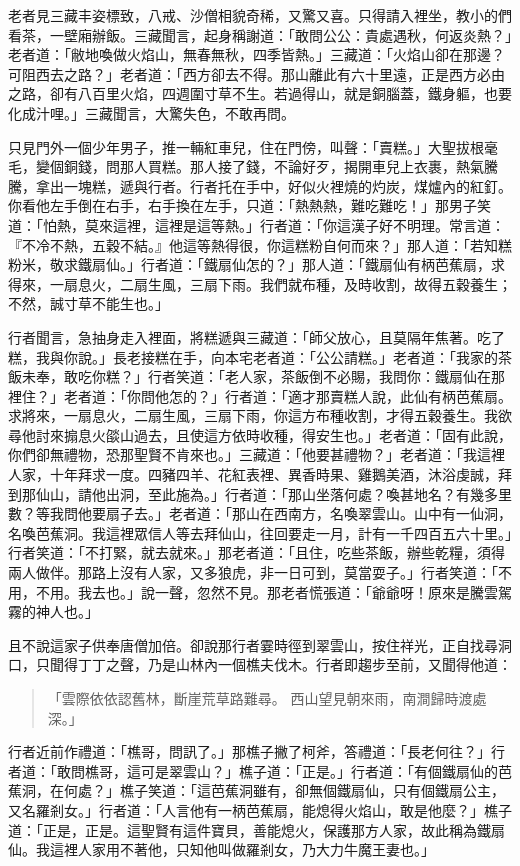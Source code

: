 老者見三藏丰姿標致，八戒、沙僧相貌奇稀，又驚又喜。只得請入裡坐，教小的們看茶，一壁廂辦飯。三藏聞言，起身稱謝道：「敢問公公：貴處遇秋，何返炎熱？」老者道：「敝地喚做火焰山，無春無秋，四季皆熱。」三藏道：「火焰山卻在那邊？可阻西去之路？」老者道：「西方卻去不得。那山離此有六十里遠，正是西方必由之路，卻有八百里火焰，四週圍寸草不生。若過得山，就是銅腦蓋，鐵身軀，也要化成汁哩。」三藏聞言，大驚失色，不敢再問。

只見門外一個少年男子，推一輛紅車兒，住在門傍，叫聲：「賣糕。」大聖拔根毫毛，變個銅錢，問那人買糕。那人接了錢，不論好歹，揭開車兒上衣裹，熱氣騰騰，拿出一塊糕，遞與行者。行者托在手中，好似火裡燒的灼炭，煤爐內的紅釘。你看他左手倒在右手，右手換在左手，只道：「熱熱熱，難吃難吃！」那男子笑道：「怕熱，莫來這裡，這裡是這等熱。」行者道：「你這漢子好不明理。常言道：『不冷不熱，五穀不結。』他這等熱得很，你這糕粉自何而來？」那人道：「若知糕粉米，敬求鐵扇仙。」行者道：「鐵扇仙怎的？」那人道：「鐵扇仙有柄芭蕉扇，求得來，一扇息火，二扇生風，三扇下雨。我們就布種，及時收割，故得五穀養生；不然，誠寸草不能生也。」

行者聞言，急抽身走入裡面，將糕遞與三藏道：「師父放心，且莫隔年焦著。吃了糕，我與你說。」長老接糕在手，向本宅老者道：「公公請糕。」老者道：「我家的茶飯未奉，敢吃你糕？」行者笑道：「老人家，茶飯倒不必賜，我問你：鐵扇仙在那裡住？」老者道：「你問他怎的？」行者道：「適才那賣糕人說，此仙有柄芭蕉扇。求將來，一扇息火，二扇生風，三扇下雨，你這方布種收割，才得五穀養生。我欲尋他討來搧息火燄山過去，且使這方依時收種，得安生也。」老者道：「固有此說，你們卻無禮物，恐那聖賢不肯來也。」三藏道：「他要甚禮物？」老者道：「我這裡人家，十年拜求一度。四豬四羊、花紅表裡、異香時果、雞鵝美酒，沐浴虔誠，拜到那仙山，請他出洞，至此施為。」行者道：「那山坐落何處？喚甚地名？有幾多里數？等我問他要扇子去。」老者道：「那山在西南方，名喚翠雲山。山中有一仙洞，名喚芭蕉洞。我這裡眾信人等去拜仙山，往回要走一月，計有一千四百五六十里。」行者笑道：「不打緊，就去就來。」那老者道：「且住，吃些茶飯，辦些乾糧，須得兩人做伴。那路上沒有人家，又多狼虎，非一日可到，莫當耍子。」行者笑道：「不用，不用。我去也。」說一聲，忽然不見。那老者慌張道：「爺爺呀！原來是騰雲駕霧的神人也。」

且不說這家子供奉唐僧加倍。卻說那行者霎時徑到翠雲山，按住祥光，正自找尋洞口，只聞得丁丁之聲，乃是山林內一個樵夫伐木。行者即趨步至前，又聞得他道：
\begin{quote}
「雲際依依認舊林，斷崖荒草路難尋。
西山望見朝來雨，南澗歸時渡處深。」
\end{quote}

行者近前作禮道：「樵哥，問訊了。」那樵子撇了柯斧，答禮道：「長老何往？」行者道：「敢問樵哥，這可是翠雲山？」樵子道：「正是。」行者道：「有個鐵扇仙的芭蕉洞，在何處？」樵子笑道：「這芭蕉洞雖有，卻無個鐵扇仙，只有個鐵扇公主，又名羅剎女。」行者道：「人言他有一柄芭蕉扇，能熄得火焰山，敢是他麼？」樵子道：「正是，正是。這聖賢有這件寶貝，善能熄火，保護那方人家，故此稱為鐵扇仙。我這裡人家用不著他，只知他叫做羅剎女，乃大力牛魔王妻也。」

